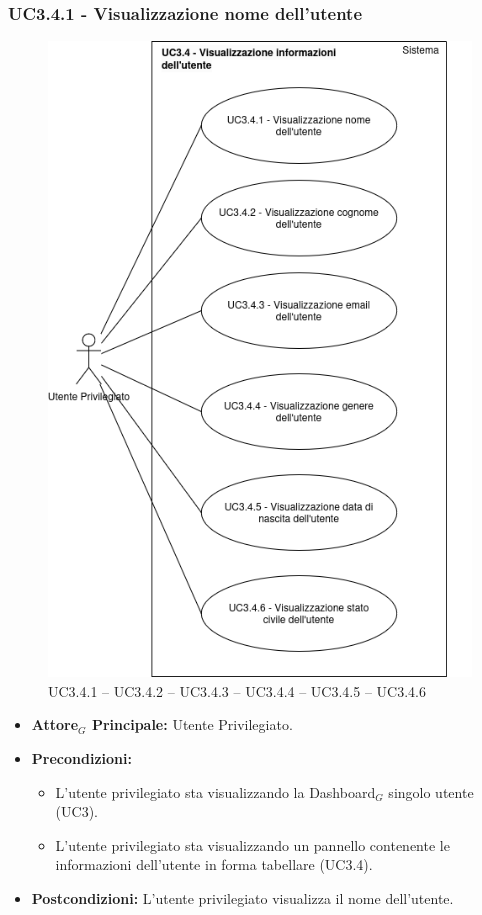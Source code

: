 \documentclass[10pt]{article}
\begin{document}
\begin{justify}
\subsubsection{\textbf{UC3.4.1 - Visualizzazione nome dell'utente}}
\begin{figure}[H]
    \centering
    \includegraphics[width=0.7\linewidth]{UC3.4.1image.png}
    \caption{UC3.4.1 -- UC3.4.2 -- UC3.4.3 -- UC3.4.4 -- UC3.4.5 -- UC3.4.6}
    \label{fig:UC3.4.1}
\end{figure}
\label{UC3.4.1}
\begin{itemize}
     \item \textbf{Attore$_G$ Principale:} Utente Privilegiato.
     \item \textbf{Precondizioni:}
        \begin{itemize}
    	\item L'utente privilegiato sta visualizzando la Dashboard$_G$ singolo utente (UC3).
          \item L'utente privilegiato sta visualizzando un pannello contenente le informazioni dell'utente in forma tabellare (UC3.4).
        \end{itemize}
      \item \textbf{Postcondizioni:} L'utente privilegiato visualizza il nome dell'utente. 

\end{itemize}
\end{justify}
\end{document}
